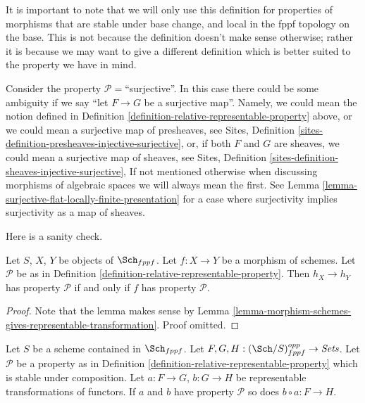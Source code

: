 \noindent
It is important to note that we will only use this definition for
properties of morphisms that are stable under base change, and
local in the fppf topology on the base. This is
not because the definition doesn't make sense otherwise; rather it
is because we may want to give a different definition which is
better suited to the property we have in mind.

\begin{remark}
\label{remark-warning}
Consider the property $\mathcal{P}=$``surjective''.
In this case there could be some ambiguity if we say
``let $F \to G$ be a surjective map''.
Namely, we could mean the notion defined
in Definition \ref{definition-relative-representable-property}
above, or we could mean a surjective map of presheaves, see
Sites, Definition \ref{sites-definition-presheaves-injective-surjective},
or, if both $F$ and $G$ are sheaves,
we could mean a surjective map of sheaves, see
Sites, Definition \ref{sites-definition-sheaves-injective-surjective},
If not mentioned otherwise when discussing morphisms of algebraic spaces
we will always mean the first. See
Lemma \ref{lemma-surjective-flat-locally-finite-presentation}
for a case where surjectivity implies surjectivity as a map of sheaves.
\end{remark}

\noindent
Here is a sanity check.

\begin{lemma}
\label{lemma-morphism-schemes-gives-representable-transformation-property}
Let $S$, $X$, $Y$ be objects of $\Sch_{fppf}$.
Let $f : X \to Y$ be a morphism of schemes.
Let $\mathcal{P}$ be as in
Definition \ref{definition-relative-representable-property}.
Then $h_X \longrightarrow h_Y$ has property $\mathcal{P}$ if
and only if $f$ has property $\mathcal{P}$.
\end{lemma}

\begin{proof}
Note that the lemma makes sense by
Lemma \ref{lemma-morphism-schemes-gives-representable-transformation}.
Proof omitted.
\end{proof}

\begin{lemma}
\label{lemma-composition-representable-transformations-property}
Let $S$ be a scheme contained in $\Sch_{fppf}$.
Let $F, G, H : (\Sch/S)_{fppf}^{opp} \to \textit{Sets}$.
Let $\mathcal{P}$ be a property as in
Definition \ref{definition-relative-representable-property}
which is stable under composition.
Let $a : F \to G$, $b : G \to H$ be representable transformations of functors.
If $a$ and $b$ have property $\mathcal{P}$ so does
$b \circ a : F \longrightarrow H$.
\end{lemma}

